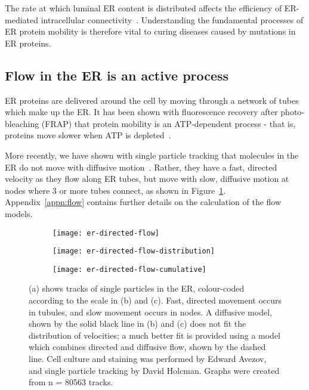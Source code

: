 The rate at which luminal ER content is distributed affects the efficiency of ER-mediated intracellular connectivity~\cite{hubner2014membrane, blackstone2011hereditary}.
Understanding the fundamental processes of ER protein mobility is therefore vital to curing diseases caused by mutations in ER proteins.

\subsection{Flow in the ER is an active process}
ER proteins are delivered around the cell by moving through a network of tubes which make up the ER.
It has been shown with fluorescence recovery after photo-bleaching (FRAP) that protein mobility is an ATP-dependent process - that is, proteins move slower when ATP is depleted~\cite{dayel1999diffusion, nehls2000dynamics}.

More recently, we have shown with single particle tracking that molecules in the ER do not move with diffusive motion~\cite{holcman2018single}.
Rather, they have a fast, directed velocity as they flow along ER tubes, but move with slow, diffusive motion at nodes where 3 or more tubes connect, as shown in Figure~\ref{fig:er-directed-flow-velocity}.
Appendix~\ref{appn:flow} contains further details on the calculation of the flow models. 

\begin{figure}[b!]
\centering
	\begin{subfigure}[b]{0.4\textwidth}
		\texttt{[image: er-directed-flow]}
		\caption{} \label{fig:er-directed-flow-velocity}
	\end{subfigure}
	\hfill
	\begin{subfigure}[b]{0.29\textwidth}
		\texttt{[image: er-directed-flow-distribution]}
		\caption{} \label{fig:er-directed-flow-distribution}
	\end{subfigure}
	\hfill
	\begin{subfigure}[b]{0.29\textwidth}
		\texttt{[image: er-directed-flow-cumulative]}
		\caption{} \label{fig:er-directed-flow-cumulative}
	\end{subfigure}
\caption[ER: Single particle tracking reveals directed flow in ER tubules]{(a) shows tracks of single particles in the ER, colour-coded according to the scale in (b) and (c). Fast, directed movement occurs in tubules, and slow movement occurs in nodes. A diffusive model, shown by the solid black line in (b) and (c) does not fit the distribution of velocities; a much better fit is provided using a model which combines directed and diffusive flow, shown by the dashed line. Cell culture and staining was performed by Edward Avezov, and single particle tracking by David Holcman. Graphs were created from n = \num{80563} tracks. }
\label{fig:ER-directed-flow-velocity}
\end{figure}


